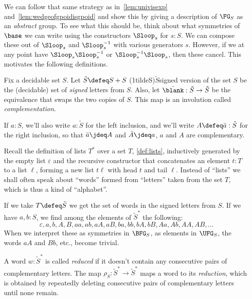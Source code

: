 We can follow that same strategy as in~\cref{lem:univisexp}
and~\cref{lem:wedgeofgpoidisgpoid}
and show this by giving a description of $\FG_S$ as an \emph{abstract} group.
To see what this should be, think about what symmetries of $\base$
we can write using the constructors $\Sloop_s$ for $s:S$.
We can compose these out of $\Sloop_s$ and $\Sloop_s^{-1}$
with various generators $s$.
However, if we at any point have $\Sloop_s\Sloop_s^{-1}$ or $\Sloop_s^{-1}\Sloop_s$,
then these cancel.
This motivates the following definitions.

\begin{definition}
  Fix a decidable set $S$. Let $\tilde S \defeq S + S$%
  \glossary(1tildeS){$\tilde S$}{signed version of the set $S$}
  be the (decidable) set of \emph{signed} letters from $S$.
  Also, let $\bar{\blank} : \tilde S \to \tilde S$
  be the equivalence that swaps the two copies of $S$.
  This map is an involution called \emph{complementation}.
\end{definition}

If $a:S$, we'll also write $a:\tilde S$ for the left inclusion,
and we'll write $A\defeq\bar a:\tilde S$ for the right inclusion,
so that $\bar a \jdeq A$ and $\bar A \jdeq a$, \ie $a$ and $A$ are complementary.

Recall the definition of lists $T^*$ over a set $T$, \cref{def:lists},
inductively generated by the empty list $\varepsilon$ and
the recursive constructor
that concatenates an element $t:T$ to a list $\ell$,
forming a new list $t\ell$ with head $t$ and tail $\ell$.
Instead of ``lists'' we shall often speak about ``words''
formed from ``letters''
taken from the set $T$, which is thus a kind of ``alphabet''.

If we take $T \defeq \tilde S$ we get the set of words in the signed letters from $S$. If we have $a,b:S$, we find among the elements of $\tilde S^*$ the following:
\[
  \varepsilon,a,b,A,B,aa,ab,aA,aB,ba,bb,bA,bB,Aa,Ab,AA,AB,\ldots
\]
When we interpret these as symmetries in $\BFG_S$, \ie as elements in $\UFG_S$,
the words $aA$ and $Bb$, etc., become trivial.
\begin{definition}
  A word $w : \tilde S^*$ is called \emph{reduced}
  if it doesn't contain any consecutive pairs of complementary letters.
  The map $\rho_S : \tilde S^* \to \tilde S^*$ maps a word to its \emph{reduction},
  which is obtained by repeatedly deleting consecutive pairs of complementary
  letters until none remain.
\end{definition}

